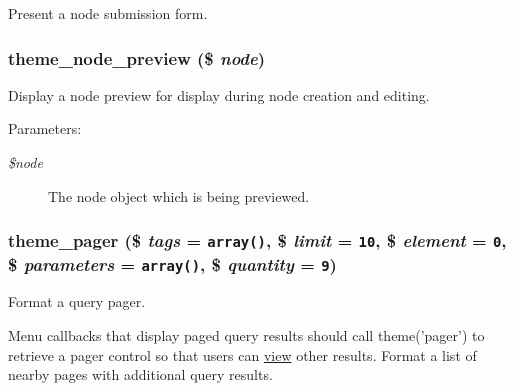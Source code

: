 Present a node submission form. \hypertarget{group__themeable_gfd0ecfb60057deb25b781a272a45a3a7}{
\subsubsection[{theme\_\-node\_\-preview}]{\setlength{\rightskip}{0pt plus 5cm}theme\_\-node\_\-preview (\$ {\em node})}}
\label{group__themeable_gfd0ecfb60057deb25b781a272a45a3a7}


Display a node preview for display during node creation and editing.

\begin{Desc}
\item[Parameters:]
\begin{description}
\item[{\em \$node}]The node object which is being previewed. \end{description}
\end{Desc}
\hypertarget{group__themeable_g6901a5d4e96c9b81a92b3fa2e43cfebd}{
\subsubsection[{theme\_\-pager}]{\setlength{\rightskip}{0pt plus 5cm}theme\_\-pager (\$ {\em tags} = {\tt array()}, \/  \$ {\em limit} = {\tt 10}, \/  \$ {\em element} = {\tt 0}, \/  \$ {\em parameters} = {\tt array()}, \/  \$ {\em quantity} = {\tt 9})}}
\label{group__themeable_g6901a5d4e96c9b81a92b3fa2e43cfebd}


Format a query pager.

Menu callbacks that display paged query results should call theme('pager') to retrieve a pager control so that users can \hyperlink{classview}{view} other results. Format a list of nearby pages with additional query results.

